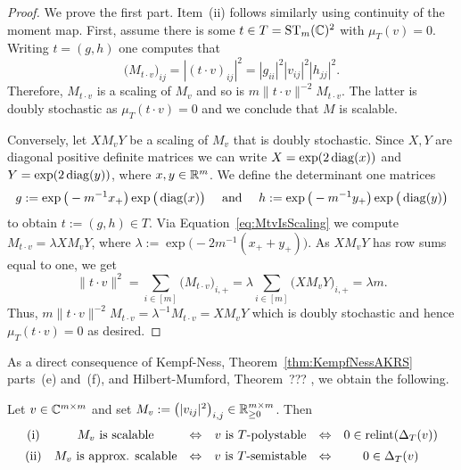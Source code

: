 \begin{proof}
	We prove the first part. Item~(ii) follows similarly using continuity of the moment map.
	First, assume there is some $t \in T = \operatorname{ST}_m(\mathbb C)^2$ with $\mu_{T}(v) = 0$. Writing $t = (g,h)$ one computes that
		\begin{equation}\label{eq:MtvIsScaling}
			\big( M_{t \cdot v} \big)_{ij} = | (t \cdot v)_{ij} |^2 = |g_{ii}|^2 |v_{ij}|^2 |h_{jj}|^2 .
		\end{equation}
	Therefore, $M_{t \cdot v}$ is a scaling of $M_v$ and so is $m \|t \cdot v\|^{-2} M_{t\cdot v}$. The latter is doubly stochastic as $\mu_T(t \cdot v) = 0$ and we conclude that $M$ is scalable.
	
	Conversely, let $X M_v Y$ be a scaling of $M_v$ that is doubly stochastic. Since $X,Y$ are diagonal positive definite matrices we can write $X = \exp(2\operatorname{diag}(x))$ and $Y = \exp(2 \operatorname{diag}(y))$, where $x,y \in \mathbb R^m$. We define the determinant one matrices
		\[ g := \exp \big( - m^{-1} x_+ \big) \exp\big( \operatorname{diag}(x) \big) \quad \text{ and }\quad  h := \exp \big( - m^{-1} y_+ \big) \exp\big( \operatorname{diag}(y) \big) \]
	to obtain $t := (g,h) \in T$. Via Equation~\eqref{eq:MtvIsScaling} we compute $M_{t \cdot v} = \lambda X M_v Y$, where $\lambda := \exp \big( - 2 m^{-1} (x_+ + y_+) \big)$. As $X M_v Y$ has row sums equal to one, we get 
		\[ \| t \cdot v \|^2 = \sum_{i \in [m]} \big(M_{t \cdot v} \big)_{i,+} 
		= \lambda \sum_{i \in [m]} \big( X M_{v} Y \big)_{i,+} = \lambda m .  \] 
	Thus, $m \|t\cdot v \|^{-2} M_{t \cdot v} = \lambda^{-1} M_{t \cdot v} = X M_v Y$ which is doubly stochastic and hence $\mu_T(t \cdot v ) = 0$ as desired.
\end{proof}

As a direct consequence of Kempf-Ness, Theorem~\ref{thm:KempfNessAKRS} parts~(e) and~(f), and Hilbert-Mumford, Theorem~???%
, we obtain the following.

\begin{cor} \label{cor:MatrixScalingKempfNess}
	Let $v \in \mathbb C^{m \times m}$ and set $M_v := \big( |v_{ij}|^2 \big)_{i,j} \in \mathbb R_{\geq 0}^{m \times m}$. Then
		\[ \begin{matrix}
			\text{(i)} & M_v \text{ is scalable} & \Leftrightarrow & v \text{ is } T\text{-polystable} & \Leftrightarrow & 0 \in \operatorname{relint}(\Delta_{T}(v)) \\[5pt]
			
			\text{(ii)} & M_v \text{ is approx. scalable} & \Leftrightarrow & v \text{ is } T\text{-semistable} & \Leftrightarrow & 0 \in \Delta_{T}(v)
		\end{matrix} \]
\end{cor}

